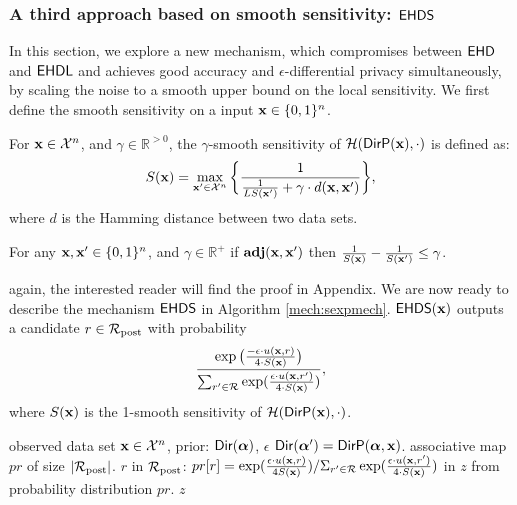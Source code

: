 \documentclass{article}
\begin{document}
\subsubsection{A third approach based on smooth sensitivity: $\hexpmech$}
\label{sec_ehds}
In this section, we explore a new mechanism, which compromises between $\mathsf{EHD}$ and $\mathsf{EHDL}$ and  achieves good accuracy and $\epsilon$-differential privacy simultaneously,
by scaling the noise to a smooth upper bound on the local sensitivity.
We first define the smooth sensitivity on a input $\textbf{x}\in\{0,1\}^n$.
\begin{definition}
\label{def_gamma_smooth}
For $\textbf{x}\in\mathcal{X}^n$, and $\gamma \in \mathbb{R}^{> 0}$, the $\gamma$-smooth sensitivity of $\mathcal{H}(\mathsf{DirP}(\textbf{x}),\cdot)$ is defined as:
\begin{equation}
  \label{eq_smooth}
   S(\textbf{x})=\max_{\textbf{x}' \in \mathcal{X}^{n}}\bigg \{ \frac{1}{\frac{1}{LS(\textbf{x}')} +\gamma \cdot d(\textbf{x},\textbf{x}')} \bigg \},
\end{equation}
where $d$ is the Hamming distance between two data sets.
\end{definition}

\begin{thm}
  \label{thm_gamma_smooth}
  For any $\textbf{x}, \textbf{x}'\in\{0,1\}^n$, and $\gamma \in \mathbb{R}^{+}$
  if  $\textbf{adj}(\textbf{x},\textbf{x}')$ then $\frac{1}{S(\textbf{x})} - \frac{1}{S(\textbf{x}')} \leq \gamma$.
\end{thm}
again, the interested reader will find the proof in Appendix.
We are now ready to describe the mechanism $\hexpmech$ in Algorithm \ref{mech:sexpmech}. $\mathsf{EHDS}(\textbf{x})$ outputs a candidate $r \in \mathcal{R}_{\textup{post}}$ with probability
\[
  \frac {\exp\big(\frac{-\epsilon\cdot u(\textbf{x}, {r})}{4\cdot S(\textbf{x})}\big)}
  {\sum_{r' \in \mathcal{R}}\exp(\frac{\epsilon\cdot u(\textbf{x}, {r'})}{4\cdot S(\textbf{x})})},
\]
where $S(\textbf{x})$ is the 1-smooth sensitivity of  $\mathcal{H}(\mathsf{DirP}(\textbf{x}),\cdot)$. {\color{red}{why do we choose 1???}}
  \begin{algorithm}
  \caption{$\hexpmech$}
  \label{mech:sexpmech}
  \begin{algorithmic}
  \INPUT observed data set $\textbf{x} \in \mathcal{X}^n$,  prior: $\mathsf{Dir}(\boldsymbol{\alpha})$, $\epsilon$
  \STATE {} $\mathsf{Dir}(\boldsymbol{\alpha}') = \mathsf{DirP}(\boldsymbol{\alpha},\textbf{x})$.
  \STATE {} associative map $pr$ of size $|\mathcal{R}_{\textup{post}}|$.
  \STATE {} $r$ in $\mathcal{R}_{\textup{post}}$:
  \STATE \quad \quad $pr[r] = 
  {\exp(\frac{\epsilon \cdot u(\textbf{x}, {r})}{4 S(\textbf{x})})}
/ {\Sigma_{r' \in \mathcal{R}}\exp(\frac{\epsilon \cdot u(\textbf{x}, {r'})}{4 \cdot S(\textbf{x})})}$
\STATE {} in $z$ from probability distribution $pr$.
 $z$
  \end{algorithmic}
\end{algorithm}
\end{document}
